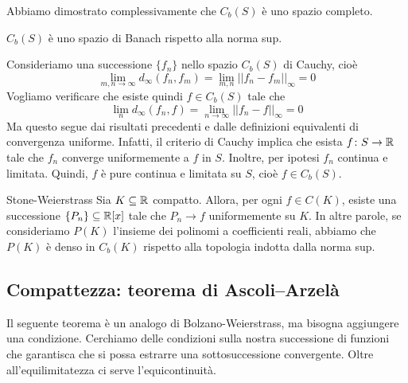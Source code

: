\documentclass[a4paper]{article}
\begin{document}
\begin{radioactive}
Abbiamo dimostrato complessivamente che \(C_b(S)\) è uno spazio completo.
\end{radioactive}

\begin{radioactive}
\begin{snippettheorem}{}
    \(C_b(S)\) è uno spazio di Banach rispetto alla norma sup.
\end{snippettheorem}
\end{radioactive}

\begin{radioactive}
\begin{snippetproof}{}
    Consideriamo una successione \(\{f_n\}\) nello spazio \(C_b(S)\) di Cauchy, cioè
    \[
        \lim_{m,n\to\infty} d_\infty(f_n, f_m) = \lim_{m,n} ||f_n - f_m||_\infty = 0
    \]
    Vogliamo verificare che esiste quindi \(f \in C_b(S)\) tale che
    \[
        \lim_n d_\infty(f_n, f) = \lim_{n\to\infty}||f_n-f||_\infty=0
    \]
    Ma questo segue dai risultati precedenti e dalle definizioni equivalenti di convergenza uniforme.
    Infatti, il criterio di Cauchy implica
    che esista \(f \colon S \to \mathbb{R}\) tale che \(f_n\) converge uniformemente a \(f\) in \(S\).
    Inoltre, per ipotesi \(f_n\) continua e limitata.
    Quindi, \(f\) è pure continua e limitata su \(S\), cioè \(f \in C_b(S)\).
\end{snippetproof}
\end{radioactive}

\begin{radioactive}
\begin{snippettheorem}{Stone-Weierstrass}
    Sia \(K\subseteq\mathbb{R}\) compatto.
    Allora, per ogni \(f\in C(K)\), esiste una successione \(\{P_n\}\subseteq\mathbb{R}[x]\)
    tale che \(P_n\to f\) uniformemente su \(K\).
    In altre parole, se consideriamo \(P(K)\) l'insieme dei polinomi a coefficienti reali, abbiamo che
    \(P(K)\) è denso in \(C_b(K)\) rispetto alla topologia indotta
    dalla norma sup.
\end{snippettheorem}
\end{radioactive}

\subsection{Compattezza: teorema di Ascoli--Arzelà}

\begin{radioactive}
Il seguente teorema è un analogo di Bolzano-Weierstrass, ma bisogna aggiungere una condizione.
Cerchiamo delle condizioni sulla nostra successione di funzioni che garantisca che
si possa estrarre una sottosuccessione convergente.
Oltre all'equilimitatezza ci serve l'equicontinuità.
\end{radioactive}
\end{document}
